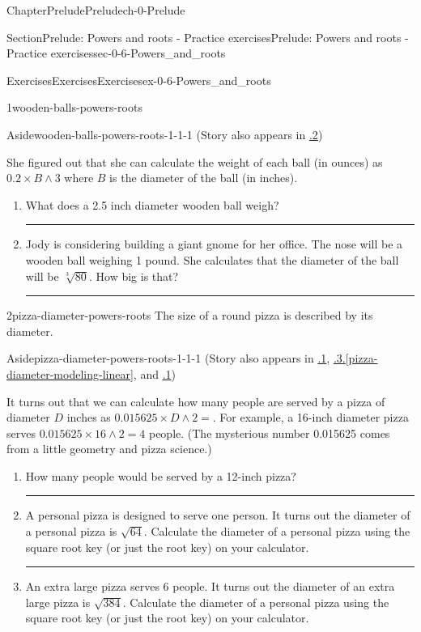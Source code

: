 \documentclass[twoside,11pt,]{book}
\newcommand{\xreffont}{\relax}
\newlength{\workspacestrutwidth}
\numberwithin{equation}{section}
\begin{document}
\begin{chapterptx}{Chapter}{Prelude}{}{Prelude}{}{}{ch-0-Prelude}
\begin{sectionptx}{Section}{Prelude: Powers and roots - Practice exercises}{}{Prelude: Powers and roots - Practice exercises}{}{}{sec-0-6-Powers_and_roots}
\begin{exercises-subsection-numberless}{Exercises}{Exercises}{}{Exercises}{}{}{ex-0-6-Powers_and_roots}
\begin{divisionexercise}{1}{}{}{wooden-balls-powers-roots}
\begin{aside}{Aside}{}{wooden-balls-powers-roots-1-1-1}
(Story also appears in \hyperlink{wooden-balls-algebraic-notation}{{\xreffont 0.7.2}})%
\end{aside}
 She figured out that she can calculate the weight of each ball (in ounces) as \(0.2 \times B \wedge 3\) where \(B\) is the diameter of the ball (in inches).%
\begin{enumerate}[label=(\alph*),ref=\alph*]%
\item{}What does a 2.5 inch diameter wooden ball weigh?%
\par\rule{\workspacestrutwidth}{0.7in}%
\item{}Jody is considering building a giant gnome for her office. The nose will be a wooden ball weighing 1 pound. She calculates that the diameter of the ball will be \(\sqrt[3]{80}\). How big is that?%
\par\rule{\workspacestrutwidth}{0.7in}%
\end{enumerate}%
\end{divisionexercise}%
 \begin{divisionexercise}{2}{}{}{pizza-diameter-powers-roots}%
The size of a round pizza is described by its diameter. \begin{aside}{Aside}{}{pizza-diameter-powers-roots-1-1-1}%
(Story also appears in \hyperlink{pizza-diameter-approx-solutions}{{\xreffont 2.4.1}}, \hyperref[pizza-diameter-modeling-linear]{{\xreffont 4.1.3}.{\xreffont\ref{pizza-diameter-modeling-linear}}}, and \hyperlink{pizza-diameter-solving-power}{{\xreffont 3.3.1}})%
\end{aside}
 It turns out that we can calculate how many people are served by a pizza of diameter \(D\) inches as \(0.015625 \times D \wedge 2=\). For example, a 16-inch diameter pizza serves \(0.015625 \times 16 \wedge 2 = 4\) people. (The mysterious number 0.015625 comes from a little geometry and pizza science.)%
\begin{enumerate}[label=(\alph*),ref=\alph*]%
\item{}How many people would be served by a 12-inch pizza?%
\par\rule{\workspacestrutwidth}{0.7in}%
\item{}A personal pizza is designed to serve one person. It turns out the diameter of a personal pizza is \(\sqrt{64}\). Calculate the diameter of a personal pizza using the square root key (or just the root key) on your calculator.%
\par\rule{\workspacestrutwidth}{0.7in}%
\item{}An extra large pizza serves 6 people. It turns out the diameter of an extra large pizza is \(\sqrt{384}\). Calculate the diameter of a personal pizza using the square root key (or just the root key) on your calculator.%

\end{enumerate}
\end{divisionexercise}
\end{exercises-subsection-numberless}
\end{sectionptx}
\end{chapterptx}
\end{document}
